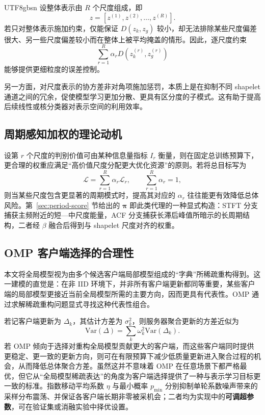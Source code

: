 \documentclass{article}
\begin{document}
\begin{CJK*}{UTF8}{gbsn}
设整体表示由 $R$ 个尺度组成，即
\begin{equation}
z=[z^{(1)},z^{(2)},\dots,z^{(R)}].
\end{equation}
若只对整体表示施加约束，仅能保证 $D(z_k,z_g)$ 较小，却无法排除某些尺度偏差很大、另一些尺度偏差较小而在整体上被平均掩盖的情形。因此，逐尺度约束
\begin{equation}
\sum_{r=1}^{R}\alpha_r D\!\left(z_k^{(r)}, z_g^{(r)}\right)
\end{equation}
能够提供更细粒度的误差控制。

另一方面，对尺度表示的协方差非对角项施加惩罚，本质上是在抑制不同 shapelet 通道之间的冗余，促使模型学习更加分散、更具有区分度的子模式。这有助于提高后续线性或核分类器对表示空间的利用效率。

\subsection{周期感知加权的理论动机}

设第 $r$ 个尺度的判别价值可由某种信息量指标 $I_r$ 衡量，则在固定总训练预算下，更合理的权重应满足“高价值尺度分配更大优化资源”的原则。若将总目标写为
\begin{equation}
\mathcal{L}=\sum_{r=1}^{R}\alpha_r \mathcal{L}_r,\qquad \sum_{r=1}^{R}\alpha_r=1,
\end{equation}
则当某些尺度包含更显著的周期模式时，提高其对应的 $\alpha_r$ 往往能更有效降低总体风险。第~\ref{sec:period-score} 节给出的 $\bm{\pi}$ 即此类代理的一种显式构造：STFT 分支捕获主频附近的短—中尺度能量，ACF 分支捕获长滞后峰值所暗示的长周期结构，二者经 $\beta$ 融合后得到与 shapelet 尺度对齐的权重。

\subsection{OMP 客户端选择的合理性}

本文将全局模型视为由多个候选客户端局部模型组成的“字典”所稀疏重构得到。这一建模的直觉是：在非 IID 环境下，并非所有客户端更新都同等重要，某些客户端的局部模型更接近当前全局模型所需的主要方向，因而更具有代表性。OMP 通过求解稀疏重构问题显式寻找这种代表性组合。

若记客户端更新为 $\Delta_k$，其估计方差为 $\sigma_k^2$，则服务器聚合更新的方差近似为
\begin{equation}
\mathrm{Var}(\Delta)=\sum_{k} \omega_k^2 \mathrm{Var}(\Delta_k).
\end{equation}
若 OMP 倾向于选择对重构全局模型贡献更大的客户端，而这些客户端同时提供更稳定、更一致的更新方向，则可在有限预算下减少低质量更新进入聚合过程的机会，从而降低总体聚合方差。虽然这并不意味着 OMP 在任意场景下都严格最优，但它从“全局模型稀疏表达”的角度为客户端选择提供了一种与表示学习目标更一致的标准。指数移动平均系数 $\eta$ 与最小概率 $p_{\min}$ 分别抑制单轮系数噪声带来的采样分布震荡、并保证各客户端长期非零被采机会；二者均为实现中的\textbf{可调超参数}，可在验证集或消融实验中择优设置。


\end{CJK*}
\end{document}

